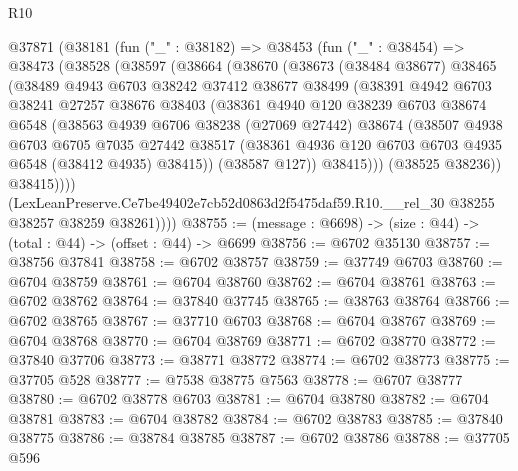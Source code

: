 \begin{lexlean}{R10}
\begin{coremodule}
  @37871
    (@38181
      (fun ("_" : @38182) =>
      @38453
        (fun ("_" : @38454) =>
        @38473
          (@38528
            (@38597
              (@38664
                (@38670
                  (@38673
                    (@38484 @38677)
                    @38465
                    (@38489
                      @4943
                      @6703
                      @38242
                      @37412
                      @38677
                      @38499
                      (@38391
                        @4942
                        @6703
                        @38241
                        @27257
                        @38676
                        @38403
                        (@38361
                          @4940
                          @120
                          @38239
                          @6703
                          @38674
                          @6548
                          (@38563
                            @4939
                            @6706
                            @38238
                            (@27069 @27442)
                            @38674
                            (@38507
                              @4938
                              @6703
                              @6705
                              @7035
                              @27442
                              @38517
                              (@38361 @4936 @120 @6703 @6703 @4935 @6548 (@38412 @4935) @38415))
                            (@38587 @127))
                          @38415)))
                    (@38525 @38236))
                  @38415))))
          (LexLeanPreserve.Ce7be49402e7cb52d0863d2f5475daf59.R10.__rel_30
            @38255
            @38257
            @38259
            @38261))))
@38755 := (message : @6698) -> (size : @44) -> (total : @44) -> (offset : @44) -> @6699
@38756 := @6702 @35130
@38757 := @38756 @37841
@38758 := @6702 @38757
@38759 := @37749 @6703
@38760 := @6704 @38759
@38761 := @6704 @38760
@38762 := @6704 @38761
@38763 := @6702 @38762
@38764 := @37840 @37745
@38765 := @38763 @38764
@38766 := @6702 @38765
@38767 := @37710 @6703
@38768 := @6704 @38767
@38769 := @6704 @38768
@38770 := @6704 @38769
@38771 := @6702 @38770
@38772 := @37840 @37706
@38773 := @38771 @38772
@38774 := @6702 @38773
@38775 := @37705 @528
@38777 := @7538 @38775 @7563
@38778 := @6707 @38777
@38780 := @6702 @38778 @6703
@38781 := @6704 @38780
@38782 := @6704 @38781
@38783 := @6704 @38782
@38784 := @6702 @38783
@38785 := @37840 @38775
@38786 := @38784 @38785
@38787 := @6702 @38786
@38788 := @37705 @596

\end{coremodule}
\end{lexlean}
